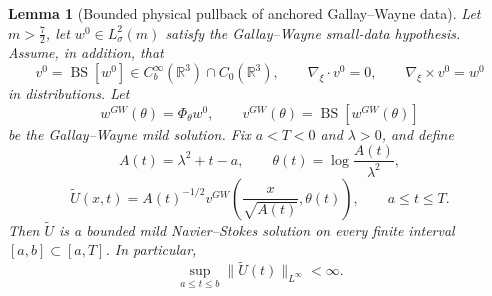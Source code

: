 \documentclass[11pt]{amsart}
\theoremstyle{plain}
\newtheorem{lemma}[lemma]{Lemma}
\theoremstyle{definition}
\theoremstyle{remark}
\numberwithin{equation}{section}
\begin{document}
\begin{lemma}[Bounded physical pullback of anchored Gallay--Wayne data]
\label{p3:lem:gw-bounded-physical-pullback}
Let \(m>\frac72\), let \(w^0\in L^2_\sigma(m)\) satisfy the
Gallay--Wayne small-data hypothesis.
Assume, in addition, that
\[
   v^0=\operatorname{BS}[w^0]\in
   C_b^\infty(\mathbb R^3)\cap C_0(\mathbb R^3),
   \qquad
   \nabla_\xi\cdot v^0=0,
   \qquad
   \nabla_\xi\times v^0=w^0
\]
in distributions.  Let
\[
   w^{GW}(\theta)=\Phi_\theta w^0,
   \qquad
   v^{GW}(\theta)=\operatorname{BS}[w^{GW}(\theta)]
\]
be the Gallay--Wayne mild solution.  Fix \(a<T<0\) and \(\lambda>0\), and define
\[
   A(t)=\lambda^2+t-a,
   \qquad
   \theta(t)=\log\frac{A(t)}{\lambda^2},
\]
\[
   \widetilde U(x,t)
   =
   A(t)^{-1/2}
   v^{GW}\!\left(\frac{x}{\sqrt{A(t)}},\theta(t)\right),
   \qquad a\le t\le T.
\]
Then \(\widetilde U\) is a bounded mild Navier--Stokes solution on every finite
interval \([a,b]\subset[a,T]\).  In particular,
\[
   \sup_{a\le t\le b}\|\widetilde U(t)\|_{L^\infty}<\infty .
\]
\end{lemma}
\end{document}
